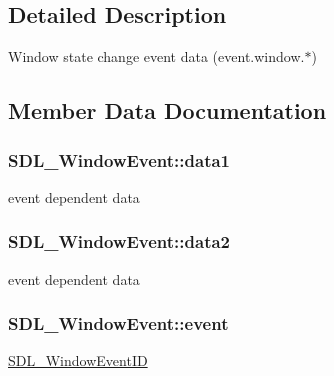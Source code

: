 \subsection{Detailed Description}
Window state change event data (event.\+window.$\ast$) 

\subsection{Member Data Documentation}
\hypertarget{struct_s_d_l___window_event_a01da0025428d3434c80021f3e4089fec}{}
\subsubsection[{data1}]{ S\+D\+L\+\_\+\+Window\+Event\+::data1}\label{struct_s_d_l___window_event_a01da0025428d3434c80021f3e4089fec}
event dependent data \hypertarget{struct_s_d_l___window_event_af6cd0a21bc9ecadfee42f6a0147d7171}{}
\subsubsection[{data2}]{ S\+D\+L\+\_\+\+Window\+Event\+::data2}\label{struct_s_d_l___window_event_af6cd0a21bc9ecadfee42f6a0147d7171}
event dependent data \hypertarget{struct_s_d_l___window_event_a485cd1f07f0f22fdb9f4c4bf214011dc}{}
\subsubsection[{event}]{ S\+D\+L\+\_\+\+Window\+Event\+::event}\label{struct_s_d_l___window_event_a485cd1f07f0f22fdb9f4c4bf214011dc}
\hyperlink{_s_d_l__video_8h_ac486b40a4860d980dbc74d0b4adf3bab}{S\+D\+L\+\_\+\+Window\+Event\+I\+D} \hypertarget{struct_s_d_l___window_event_a01c8c8fbe8564e690f958d2db560f657}{}
